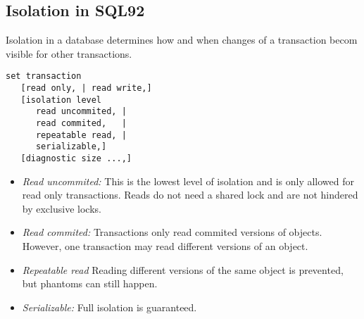 

\subsection{Isolation in SQL92}

Isolation in a database determines how and when changes of a transaction becom visible for other transactions.

\begin{lstlisting}[morekeywords={set,transaction,isolation,level,diagnostic,size}]
set transaction
   [read only, | read write,]
   [isolation level
      read uncommited, |
      read commited,   |
      repeatable read, |
      serializable,]
   [diagnostic size ...,]
\end{lstlisting}

\begin{itemize}
\item \emph{Read uncommited:} This is the lowest level of isolation and is only allowed for read only transactions. Reads do not need a shared lock and are not hindered by exclusive locks.
\item \emph{Read commited:} Transactions only read commited versions of objects. However, one transaction may read different versions of an object.
\item \emph{Repeatable read} Reading different versions of the same object is prevented, but phantoms can still happen.
\item \emph{Serializable:} Full isolation is guaranteed.
\end{itemize}


